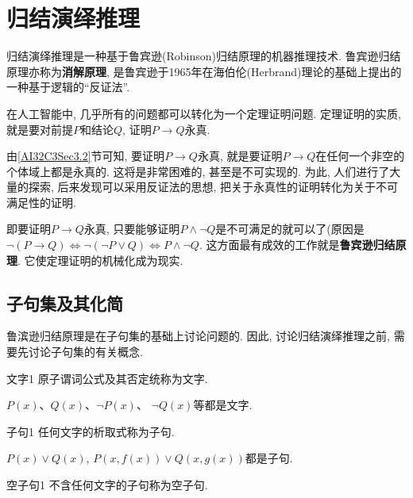 \section{归结演绎推理}
归结演绎推理是一种基于鲁宾逊(Robinson)归结原理的机器推理技术. 鲁宾逊归结原理亦称为\textbf{消解原理}, 是鲁宾逊于1965年在海伯伦(Herbrand)理论的基础上提出的一种基于逻辑的“反证法”.

在人工智能中, 几乎所有的问题都可以转化为一个定理证明问题. 定理证明的实质, 就是要对前提$P$和结论$Q$, 证明$P\rightarrow Q$永真.

由\ref{AI32C3Sec3.2}节可知, 要证明$P\rightarrow Q$永真, 就是要证明$P\rightarrow Q$在任何一个非空的个体域上都是永真的. 这将是非常困难的, 甚至是不可实现的.
为此, 人们进行了大量的探索, 后来发现可以采用反证法的思想, 把关于永真性的证明转化为关于不可满足性的证明.

即要证明$P\rightarrow Q$永真, 只要能够证明$P\wedge \neg Q$是不可满足的就可以了(原因是$\neg  (P\rightarrow Q) \Leftrightarrow  \neg (\neg  P\vee Q) \Leftrightarrow  P\wedge \neg  Q$.
这方面最有成效的工作就是\textbf{鲁宾逊归结原理}. 它使定理证明的机械化成为现实.
\subsection{子句集及其化简}

鲁滨逊归结原理是在子句集的基础上讨论问题的. 因此, 讨论归结演绎推理之前, 需要先讨论子句集的有关概念.

\begin{mydef}{文字}{1}
原子谓词公式及其否定统称为文字.
\end{mydef}

\begin{example}
  $P(x)$、$Q(x)$、$\neg  P(x)$、 $\neg  Q(x)$等都是文字.
\end{example}

\begin{mydef}{子句}{1}
   任何文字的析取式称为子句.
\end{mydef}

\begin{example}
  $P(x)\vee Q(x)$, $P(x, f(x))\vee Q(x,g(x))$都是子句.
\end{example}

\begin{mydef}{空子句}{1}
   不含任何文字的子句称为空子句.
\end{mydef}


